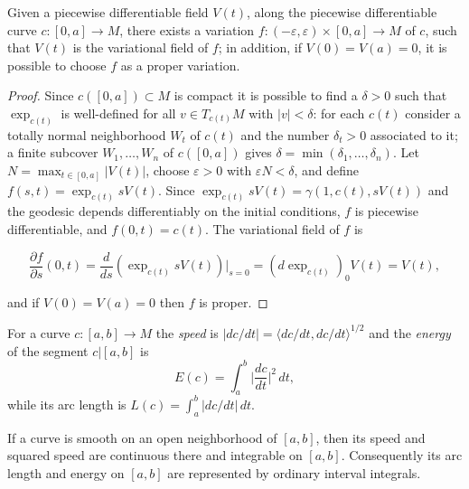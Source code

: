 \begin{proposition}
  \label{prop:dc-ch9-2-2}
  Given a piecewise differentiable field $V(t)$, along the piecewise differentiable
  curve $c:[0,a]\to M$, there exists a variation $f:(-\varepsilon,\varepsilon)\times[0,a]\to M$
  of $c$, such that $V(t)$ is the variational field of $f$; in addition, if
  $V(0)=V(a)=0$, it is possible to choose $f$ as a proper variation.
\end{proposition}
\begin{proof}
  \sketch
  Since $c([0,a])\subset M$ is compact it is possible to find a $\delta>0$
  such that $\exp_{c(t)}$ is well-defined for all $v\in T_{c(t)}M$ with $|v|<\delta$:
  for each $c(t)$ consider a totally normal neighborhood $W_t$ of $c(t)$ and the
  number $\delta_t>0$ associated to it; a finite subcover
  $W_1,\dots,W_n$ of $c([0,a])$ gives $\delta=\min(\delta_1,\dots,\delta_n)$.
  Let $N=\max_{t\in[0,a]}|V(t)|$, choose $\varepsilon>0$ with
  $\varepsilon N<\delta$, and define
  $f(s,t)=\exp_{c(t)}sV(t)$. Since $\exp_{c(t)}sV(t)=\gamma(1,c(t),sV(t))$ and the
  geodesic depends differentiably on the initial conditions, $f$ is piecewise
  differentiable, and $f(0,t)=c(t)$. The variational field of $f$ is

  $$
  \frac{\partial f}{\partial s}(0,t)=\frac{d}{ds}(\exp_{c(t)}sV(t))\Big|_{s=0}=(d\exp_{c(t)})_0 V(t)=V(t),
  $$

  and if $V(0)=V(a)=0$ then $f$ is proper.
\end{proof}
\begin{definition}
  \label{def:dc-ch9-2-2-energy}
  \leanok
  For a curve $c:[a,b]\to M$ the \emph{speed} is $|dc/dt|=\langle dc/dt,dc/dt\rangle^{1/2}$
  and the \emph{energy} of the segment $c|[a,b]$ is
  $$
  E(c)=\int_a^b\Big|\frac{dc}{dt}\Big|^2\,dt,
  $$
  while its arc length is $L(c)=\int_a^b|dc/dt|\,dt$.
\end{definition}
\begin{lemma}
  \label{lem:dc-ch9-2-2-smooth-speed-integrable}
  \leanok
  If a curve is smooth on an open neighborhood of $[a,b]$, then its speed and
  squared speed are continuous there and integrable on $[a,b]$. Consequently
  its arc length and energy on $[a,b]$ are represented by ordinary interval
  integrals.
\end{lemma}
